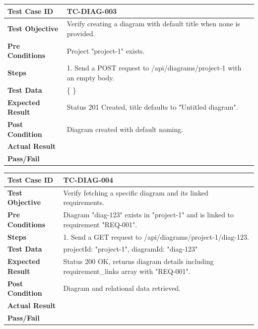 \begin{longtable}{|p{}|p{}|}
\hline
\textbf{Test Case ID} & TC-DIAG-003 \\ \hline
\textbf{Test Objective} & Verify creating a diagram with default title when none is provided. \\ \hline
\textbf{Pre Conditions} & Project "project-1" exists. \\ \hline
\textbf{Steps} & 
1. Send a POST request to /api/diagrams/project-1 with an empty body. \\ \hline
\textbf{Test Data} & \{ \} \\ \hline
\textbf{Expected Result} & Status 201 Created, title defaults to "Untitled diagram". \\ \hline
\textbf{Post Condition} & Diagram created with default naming. \\ \hline
\textbf{Actual Result} &  \\ \hline
\textbf{Pass/Fail} &  \\ \hline
\end{longtable}

\begin{longtable}{|p{}|p{}|}
\hline
\textbf{Test Case ID} & TC-DIAG-004 \\ \hline
\textbf{Test Objective} & Verify fetching a specific diagram and its linked requirements. \\ \hline
\textbf{Pre Conditions} & Diagram "diag-123" exists in "project-1" and is linked to requirement "REQ-001". \\ \hline
\textbf{Steps} & 
1. Send a GET request to /api/diagrams/project-1/diag-123. \\ \hline
\textbf{Test Data} & projectId: "project-1", diagramId: "diag-123" \\ \hline
\textbf{Expected Result} & Status 200 OK, returns diagram details including requirement\_links array with "REQ-001". \\ \hline
\textbf{Post Condition} & Diagram and relational data retrieved. \\ \hline
\textbf{Actual Result} &  \\ \hline
\textbf{Pass/Fail} &  \\ \hline
\end{longtable}

